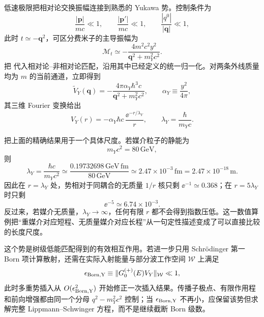 低速极限把相对论交换振幅连接到熟悉的 Yukawa 势。控制条件为
\begin{equation*}
 \frac{|\mathbf p|}{mc}\ll1,
 \qquad
 \frac{|\mathbf p'|}{mc}\ll1,
 \qquad
 \frac{|q^0|}{|\mathbf q|}\ll1,
\end{equation*}
此时 $t\simeq-\mathbf q^2$，可区分费米子的主导振幅为
\begin{equation}
 \mathcal M_t
 \simeq-\frac{4m^2c^2y^2}{\mathbf q^2+m_Y^2c^2}.
 \label{eq:yukawa-NR-M-si-r10}
\end{equation}
把 代入相对论--非相对论匹配，沿用其中已经定义的统一归一化。对两条外线质量均为 $m$ 的当前通道，立即得到
\begin{equation}
 \widetilde V_Y(\mathbf q)
 =-\frac{4\pi\alpha_Y\hbar^3c}
 {\mathbf q^2+m_Y^2c^2},
 \qquad
 \alpha_Y\equiv\frac{y^2}{4\pi},
 \label{eq:yukawa-Vq-si-r10}
\end{equation}
其三维 Fourier 变换给出
\begin{equation}
 \boxed{
 V_Y(r)
 =-\alpha_Y\hbar c\,\frac{\ee^{-r/\lambda_Y}}{r},
 \qquad
 \lambda_Y=\frac{\hbar}{m_Yc}.}
 \label{eq:yukawa-potential-SI-r10}
\end{equation}

\begin{exbox}[媒介质量怎样直接变成作用程]
把上面的精确结果用于一个具体尺度。若媒介粒子的静能为
\begin{equation*}
 m_Yc^2=80\,\mathrm{GeV},
\end{equation*}
则
\begin{equation*}
 \lambda_Y
 =\frac{\hbar c}{m_Yc^2}
 \simeq\frac{0.19732698\,\mathrm{GeV\,fm}}{80\,\mathrm{GeV}}
 \simeq2.47\times10^{-3}\,\mathrm{fm}
 =2.47\times10^{-18}\,\mathrm m.
\end{equation*}
因此在 $r=\lambda_Y$ 处，势相对于同耦合的无质量 $1/r$ 核只剩 $\ee^{-1}\simeq0.368$；在 $r=5\lambda_Y$ 时只剩
\begin{equation*}
 \ee^{-5}\simeq6.74\times10^{-3}.
\end{equation*}
反过来，若媒介无质量，$\lambda_Y\to\infty$，任何有限 $r$ 都不会得到指数压低。这一数值算例把“重媒介对应短程、无质量媒介对应长程”从一句定性描述变成了可以直接比较的长度尺度。
\end{exbox}

这个势是树级低能匹配得到的有效相互作用。若进一步只用 Schr\"odinger 第一 Born 项计算散射，还需在实际入射能量与部分波工作空间 $\mathcal W$ 上满足
\begin{equation*}
 \epsilon_{\rm Born,Y}
 \equiv
 \|G_0^{(+)}(E)V_Y\|_{\mathcal W}\ll1,
\end{equation*}
此时多重势插入从 $O(\epsilon_{\rm Born,Y}^2)$ 开始修正一次插入结果。传播子极点、有限作用程和前向增强都由同一个分母 $q^2-m_Y^2c^2$ 控制；当 $\epsilon_{\rm Born,Y}$ 不再小，应保留该势但求解完整 Lippmann--Schwinger 方程，而不是继续截断 Born 级数。



